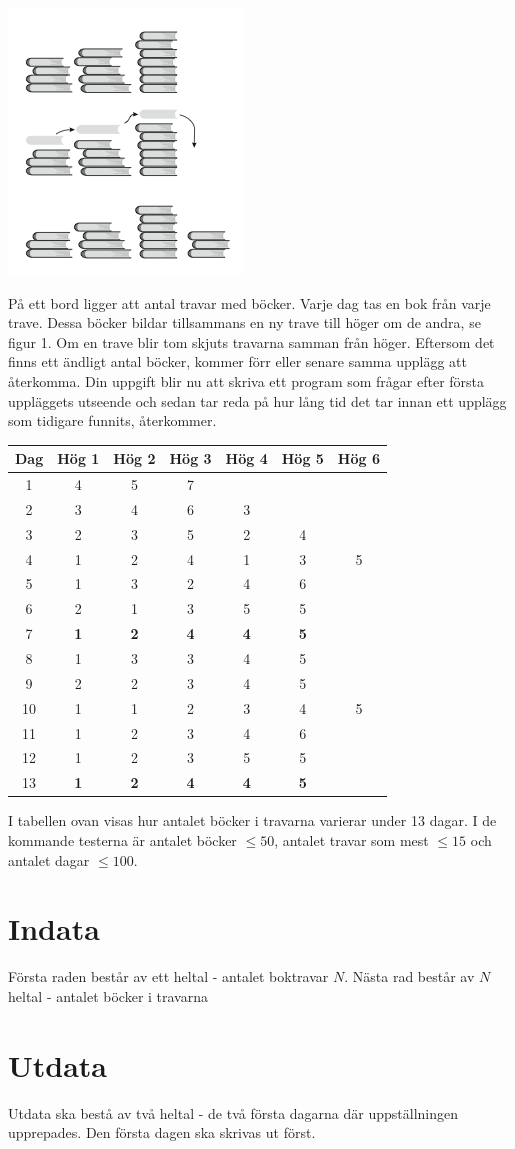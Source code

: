 
\includegraphics{Travar.png}

På ett bord ligger att antal travar med böcker. Varje dag tas en bok från varje trave. Dessa böcker bildar tillsammans en ny trave till höger om de andra, se figur 1. Om en trave blir tom skjuts travarna samman från höger. Eftersom det finns ett ändligt antal böcker, kommer förr eller senare samma upplägg att återkomma. Din uppgift blir nu att skriva ett program som frågar efter första uppläggets utseende och sedan tar reda på hur lång tid det tar innan ett upplägg som tidigare funnits, återkommer.

\begin{tabular}{|c|c|c|c|c|c|c|}
\hline
Dag&Hög 1&Hög 2&Hög 3&Hög 4&Hög 5&Hög 6\\\hline
1&4&5&7&&&\\
2&3&4&6&3&&\\
3&2&3&5&2&4&\\
4&1&2&4&1&3&5\\
5&1&3&2&4&6&\\
6&2&1&3&5&5&\\
7&\textbf{1}&\textbf{2}&\textbf{4}&\textbf{4}&\textbf{5}&\\
8&1&3&3&4&5&\\
9&2&2&3&4&5&\\
10&1&1&2&3&4&5\\
11&1&2&3&4&6&\\
12&1&2&3&5&5&\\
13&\textbf{1}&\textbf{2}&\textbf{4}&\textbf{4}&\textbf{5}&\\\hline
\end{tabular}

I tabellen ovan visas hur antalet böcker i travarna varierar under 13 dagar. I de kommande testerna är antalet böcker $ \le 50$, antalet travar som mest $ \le 15$ och antalet dagar $ \le 100$.

\section*{Indata}
Första raden består av ett heltal - antalet boktravar $N$.
Nästa rad består av $N$ heltal - antalet böcker i travarna

\section*{Utdata}
Utdata ska bestå av två heltal - de två första dagarna där uppställningen upprepades. Den första dagen ska skrivas ut först.

